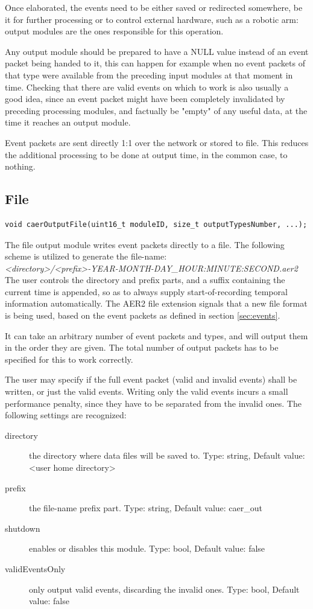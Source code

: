 \documentclass[a4paper,12pt]{report}
\begin{document}
Once elaborated, the events need to be either saved or redirected somewhere, be it for further processing or to control external hardware, such as a robotic arm: output modules are the ones responsible for this operation.

Any output module should be prepared to have a NULL value instead of an event packet being handed to it, this can happen for example when no event packets of that type were available from the preceding input modules at that moment in time.
Checking that there are valid events on which to work is also usually a good idea, since an event packet might have been completely invalidated by preceding processing modules, and factually be "empty" of any useful data, at the time it reaches an output module.

Event packets are sent directly 1:1 over the network or stored to file. This reduces the additional processing to be done at output time, in the common case, to nothing.

\subsection{File} \label{subsec:file}

\begin{lstlisting}
void caerOutputFile(uint16_t moduleID, size_t outputTypesNumber, ...);
\end{lstlisting}

The file output module writes event packets directly to a file.
The following scheme is utilized to generate the file-name:
\\\emph{<directory>/<prefix>-YEAR-MONTH-DAY\_HOUR:MINUTE:SECOND.aer2}
\\The user controls the directory and prefix parts, and a suffix containing the current time is appended, so as to always supply start-of-recording temporal information automatically.
The AER2 file extension signals that a new file format is being used, based on the event packets as defined in section \ref{sec:events}.

It can take an arbitrary number of event packets and types, and will output them in the order they are given. The total number of output packets has to be specified for this to work correctly.

The user may specify if the full event packet (valid and invalid events) shall be written, or just the valid events. Writing only the valid events incurs a small performance penalty, since they have to be separated from the invalid ones.
\clearpage
The following settings are recognized:
\begin{description}
\item[directory] the directory where data files will be saved to.
\subitem Type: string, Default value: <user home directory>
\item[prefix] the file-name prefix part.
\subitem Type: string, Default value: caer\_out
\item[shutdown] enables or disables this module.
\subitem Type: bool, Default value: false
\item[validEventsOnly] only output valid events, discarding the invalid ones.
\subitem Type: bool, Default value: false
\end{description}
\end{document}
